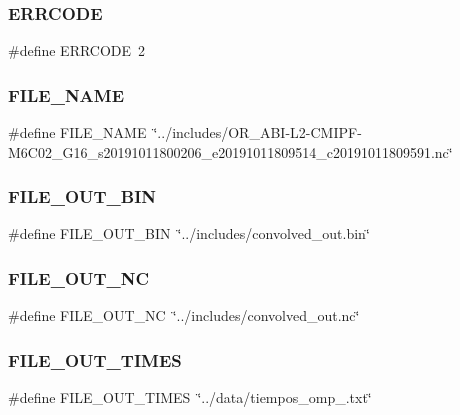 \mbox{\label{main_8c_a59923948809cf280fff5a914cc1e3781}} 
\subsubsection{ERRCODE}
{\footnotesize\ttfamily \#define E\+R\+R\+C\+O\+DE~2}

\mbox{\label{main_8c_ab117546549783a058d0321a287699579}} 
\subsubsection{FILE\_NAME}
{\footnotesize\ttfamily \#define F\+I\+L\+E\+\_\+\+N\+A\+ME~\char`\"{}../includes/O\+R\+\_\+\+A\+BI-\/L2-\/C\+M\+I\+PF-\/M6\+C02\+\_\+\+G16\+\_\+s20191011800206\+\_\+e20191011809514\+\_\+c20191011809591.\+nc\char`\"{}}

\mbox{\label{main_8c_a4fdec11bedf862a1861da6d0216c0853}} 
\subsubsection{FILE\_OUT\_BIN}
{\footnotesize\ttfamily \#define F\+I\+L\+E\+\_\+\+O\+U\+T\+\_\+\+B\+IN~\char`\"{}../includes/convolved\+\_\+out.\+bin\char`\"{}}

\mbox{\label{main_8c_ac2f8017a27496885626ba13b101b020b}} 
\subsubsection{FILE\_OUT\_NC}
{\footnotesize\ttfamily \#define F\+I\+L\+E\+\_\+\+O\+U\+T\+\_\+\+NC~\char`\"{}../includes/convolved\+\_\+out.\+nc\char`\"{}}

\mbox{\label{main_8c_afa5c422f85ae3c5f141aafda017861b0}} 
\subsubsection{FILE\_OUT\_TIMES}
{\footnotesize\ttfamily \#define F\+I\+L\+E\+\_\+\+O\+U\+T\+\_\+\+T\+I\+M\+ES~\char`\"{}../data/tiempos\+\_\+omp\+\_.\+txt\char`\"{}}

